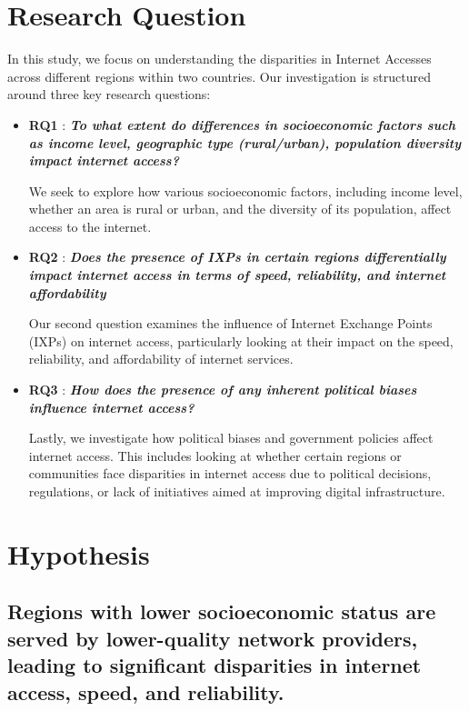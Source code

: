 \documentclass[conference]{IEEEtran}
\begin{document}
\section{Research Question}
In this study, we focus on understanding the disparities in Internet Accesses across different regions within two countries. Our investigation is structured around three key research questions:
\begin{itemize}
\item {\textbf{RQ1}} : \textbf{\textit{To what extent do differences in socioeconomic factors such as income level, geographic type (rural/urban), population diversity impact internet access?}}

We seek to explore how various socioeconomic factors, including income level, whether an area is rural or urban, and the diversity of its population, affect access to the internet. 
\item \textbf{RQ2} : \textbf{\textit{Does the presence of IXPs in certain regions differentially impact internet access in terms of speed, reliability, and internet affordability}}

Our second question examines the influence of Internet Exchange Points (IXPs) on internet access, particularly looking at their impact on the speed, reliability, and affordability of internet services.

\item \textbf{RQ3} : \textbf{\textit{How does the presence of any inherent political biases influence internet access?}}

Lastly, we investigate how political biases and government policies affect internet access. This includes looking at whether certain regions or communities face disparities in internet access due to political decisions, regulations, or lack of initiatives aimed at improving digital infrastructure.
\end{itemize}

\section{Hypothesis}
\label{sec:hypothesis}

\subsection{\textbf{Regions with lower socioeconomic status are served by lower-quality network providers, leading to significant disparities in internet access, speed, and reliability.}}
\end{document}
